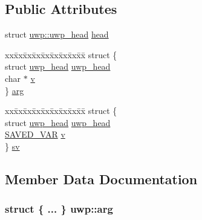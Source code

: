 \subsection*{Public Attributes}
\begin{DoxyCompactItemize}
\item 
struct \hyperlink{structuwp_1_1uwp__head}{uwp\+::uwp\+\_\+head} \hyperlink{unionuwp_acab4a7765952e1452e4d9035cdacbab5}{head}
\item 
\begin{tabbing}
xx\=xx\=xx\=xx\=xx\=xx\=xx\=xx\=xx\=\kill
struct \{\\
\>struct \hyperlink{structuwp_1_1uwp__head}{uwp\_head} \hyperlink{unionuwp_af1c38672e3b54d0270b807e058a28fd0}{uwp\_head}\\
\>char $\ast$ \hyperlink{unionuwp_a79612c93285a8ff48fa1b6184a5e97eb}{v}\\
\} \hyperlink{unionuwp_a90833ec7b08239c72d8dedfec701fca8}{arg}\\

\end{tabbing}\item 
\begin{tabbing}
xx\=xx\=xx\=xx\=xx\=xx\=xx\=xx\=xx\=\kill
struct \{\\
\>struct \hyperlink{structuwp_1_1uwp__head}{uwp\_head} \hyperlink{unionuwp_af1c38672e3b54d0270b807e058a28fd0}{uwp\_head}\\
\>\hyperlink{structSAVED__VAR}{SAVED\_VAR} \hyperlink{unionuwp_afdb9e38dfd8fb6b7ed4d7f8a7f3d7c11}{v}\\
\} \hyperlink{unionuwp_a0cbb85b5e389ab3d685c0cc51ba5c2bc}{sv}\\

\end{tabbing}\end{DoxyCompactItemize}


\subsection{Member Data Documentation}
\subsubsection[{\texorpdfstring{arg}{arg}}]{\setlength{\rightskip}{0pt plus 5cm}struct \{ ... \}   uwp\+::arg}\hypertarget{unionuwp_a90833ec7b08239c72d8dedfec701fca8}{}\label{unionuwp_a90833ec7b08239c72d8dedfec701fca8}
